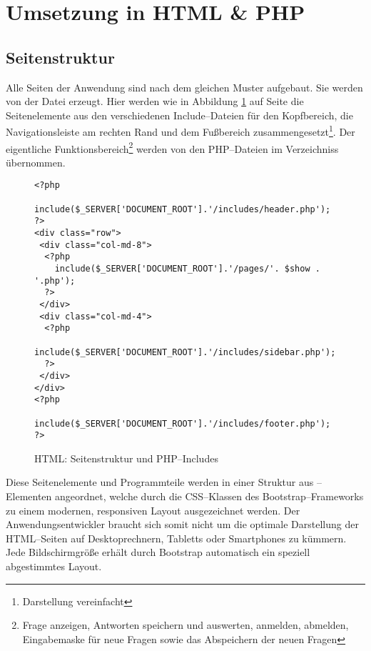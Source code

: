 \section{Umsetzung in HTML \& PHP}

\subsection{Seitenstruktur}

Alle Seiten der Anwendung sind nach dem gleichen Muster aufgebaut. Sie werden von der Datei  erzeugt. Hier werden wie in Abbildung \ref{fig:struktur} auf Seite \pageref{fig:struktur} die Seitenelemente aus den verschiedenen Include--Dateien für den Kopfbereich, die Navigationsleiste am rechten Rand und dem Fußbereich zusammengesetzt\footnote{Darstellung vereinfacht}. Der eigentliche Funktionsbereich\footnote{Frage anzeigen, Antworten speichern und auswerten, anmelden, abmelden, Eingabemaske für neue Fragen sowie das Abspeichern der neuen Fragen} werden von den PHP--Dateien im Verzeichniss  übernommen.

\begin{figure}[h]
\begin{verbatim}
<?php 
  include($_SERVER['DOCUMENT_ROOT'].'/includes/header.php'); 
?>
<div class="row">
 <div class="col-md-8">
  <?php 
    include($_SERVER['DOCUMENT_ROOT'].'/pages/'. $show . '.php'); 
  ?> 
 </div>
 <div class="col-md-4">
  <?php 
    include($_SERVER['DOCUMENT_ROOT'].'/includes/sidebar.php'); 
  ?>
 </div>	  
</div>
<?php 
  include($_SERVER['DOCUMENT_ROOT'].'/includes/footer.php'); 
?>
\end{verbatim}
\caption{HTML: Seitenstruktur und PHP--Includes}
\label{fig:struktur}
\end{figure}


Diese Seitenelemente und Programmteile werden in einer Struktur aus --Elementen angeordnet, welche durch die CSS--Klassen des Bootstrap--Frameworks zu einem modernen, responsiven Layout ausgezeichnet werden. Der Anwendungsentwickler braucht sich somit nicht um die optimale Darstellung der HTML--Seiten auf Desktoprechnern, Tabletts oder Smartphones zu kümmern. Jede Bildschirmgröße erhält durch Bootstrap automatisch ein speziell abgestimmtes Layout.

